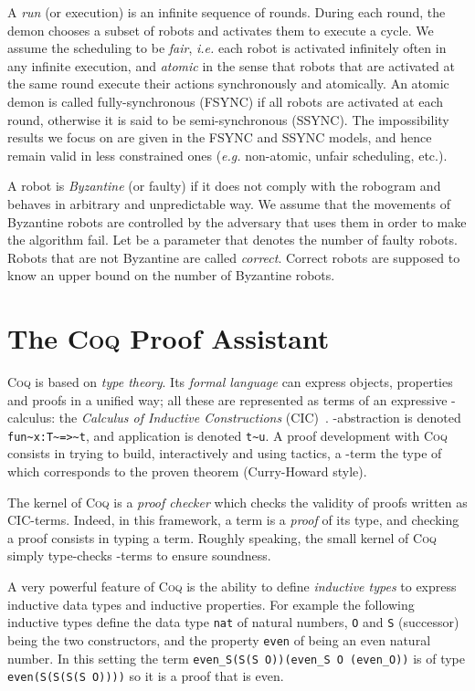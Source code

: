 \documentclass[11pt,a4]{llncs}
\newcommand{\x}{\xspace}
\newcommand{\coq}{\textsc{Coq}\x}
\begin{document}
A \emph{run} (or execution) is an infinite sequence of rounds. 
During each round, the demon chooses a subset of robots and activates them to execute a cycle.
We assume the scheduling to be \emph{fair}, \emph{i.e.} each robot is
activated infinitely often in any infinite execution, 
and \emph{atomic} in the sense that robots that
are activated at the same round execute their actions synchronously and atomically.
An atomic demon is called fully-synchronous (FSYNC) if all robots are activated at each round, 
otherwise it is said to be semi-synchronous (SSYNC).
The impossibility results we focus on are given in the FSYNC and SSYNC
models, and hence remain valid in less constrained ones (\emph{e.g.}
non-atomic, unfair scheduling, etc.).

A robot is \emph{Byzantine} (or faulty) if it does not comply with the robogram
and behaves in arbitrary and unpredictable way.
We assume that the movements of Byzantine robots are controlled by the adversary 
that uses them in order to make the algorithm fail.
Let  be a parameter that denotes the number of faulty robots.
Robots that are not Byzantine are called \emph{correct}. Correct
robots are supposed to know an upper bound on the number of Byzantine
robots. 

\section{The \coq Proof Assistant}
\label{sec:proof-assistant}

\coq{} is based on \emph{type theory}.
Its  \emph{formal language} can express objects, properties
and proofs in a unified way; all these are represented as terms of an
expressive -calculus: the \emph{Calculus of Inductive
  Constructions} (CIC)~\cite{coquand90colog}. -abstraction is
denoted \lstinline!fun~x:T~=>~t!, and application is denoted
\lstinline!t~u!.  A proof development with \coq{} consists in trying to
build, interactively and using tactics, a -term the type of
which corresponds to the proven theorem (Curry-Howard style).

The kernel of \coq is a \emph{proof checker} which checks the validity
of proofs written as CIC-terms. Indeed, in this framework, a term is a
\emph{proof} of its type, and checking a proof consists in typing a
term.  Roughly speaking, the small kernel of \coq{} simply
type-checks -terms to ensure soundness.


A very powerful feature of \coq{} is the ability to define
\emph{inductive types} to express inductive data types and inductive
properties. For example the following inductive types define the data
type \lstinline!nat! of natural numbers, \lstinline!O! and
\lstinline!S! (successor) being the two constructors, and the property \texttt{even} of being
an even natural number. In this setting the term \texttt{\small even\_S(S(S O))(even\_S O (even\_O))} is of type \texttt{\small even(S(S(S(S O))))} so it is a proof that  is even.
\end{document}

